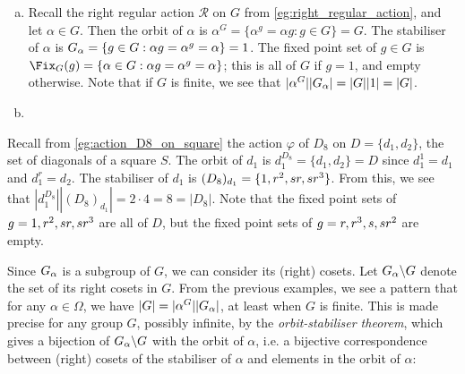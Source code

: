 \begin{example}\label{eg:rra_orbits_stabilisers}
    \begin{enumerate}[(a)]
        \item Recall the right regular action $\mathcal{R}$ on $G$ from \autoref{eg:right_regular_action}, and let $\alpha \in G$. Then the orbit of $\alpha$ is $\alpha^G = \{\alpha^g = \alpha g : g \in G\} = G$. The stabiliser of $\alpha$ is $\added{2}{G_\alpha} = \{g \in G : \alpha g = \alpha^g = \alpha\} = 1$. The fixed point set of $g \in G$ is $\Fix_G(g) = \{\alpha \in G : \alpha g = \alpha^g = \alpha\}$; this is all of $G$ if $g = 1$, and empty otherwise. Note that if $G$ is finite, we see that $|\alpha^G| |\added{2}{G_\alpha}| = |G| |1| = |G|$.
        \item {}
    \end{enumerate}
\end{example}

\begin{example}\label{eg:D8_diagonals_orbits_stabilisers}
    Recall from \autoref{eg:action_D8_on_square} the action $\varphi$ of $D_8$ on $D = \{d_1,d_2\}$, the set of diagonals of a square $S$. The orbit of $d_1$ is $d_1^{D_8} = \{d_1,d_2\} = D$ since $d_1^1 = d_1$ and $d_1^r = d_2$. The stabiliser of $d_1$ is $(D_8)_{d_1} = \{1,r^2,\added{2}{sr,sr^3}\}$. From this, we see that $|d_1^{D_8}| |(D_8)_{d_1}| = 2 \cdot 4 = 8 = |D_8|$. Note that the fixed point sets of $g = 1,r^2,\added{2}{sr,sr^3}$ are all of $D$, but the fixed point sets of $g = r,r^3,s,\added{2}{sr^2}$ are empty.
\end{example}

Since $\added{2}{G_\alpha}$ is a subgroup of $G$, we can consider its (right) cosets. Let $\added{2}{G_\alpha} \backslash G$ denote the set of its right cosets in $G$. From the previous examples, we see a pattern that for any $\alpha \in \Omega$, we have $|G| = |\alpha^G| |\added{2}{G_\alpha}|$, at least when $G$ is finite. This is made precise for any group $G$, possibly infinite, by the \textit{orbit-stabiliser theorem}, which gives a bijection of $\added{2}{G_\alpha} \backslash G$ with the orbit of $\alpha$, i.e. a bijective correspondence between (right) cosets of the stabiliser of $\alpha$ and elements in the orbit of $\alpha$:

